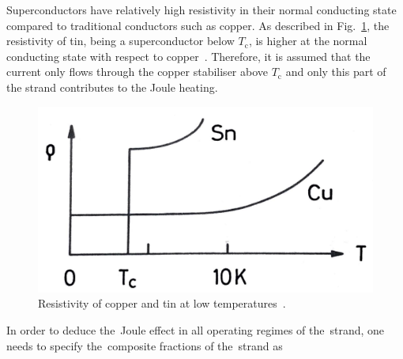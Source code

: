 Superconductors have relatively high resistivity in their normal conducting state compared to traditional conductors such as copper. As described in Fig.~\ref{fig:resitivity_tin_copper}, the resistivity of tin, being a superconductor below $T_\text{c}$, is higher at the normal conducting state with respect to copper~\cite[p.~1-6]{superconducting_accelerator_magnets}. Therefore, it is assumed that the current only flows through the copper stabiliser above $T_\text{c}$ and only this part of the strand contributes to the Joule heating. 

\begin{figure}[H]
    \centering
    \includegraphics[width=0.35\linewidth]{sections/introduction/figures/sn_cu_resistivity.png}
    \caption{Resistivity of copper and tin at low temperatures~\cite{superconducting_accelerator_magnets}.}
    \label{fig:resitivity_tin_copper}
\end{figure} 

In order to deduce the~Joule effect in all operating regimes of the~strand, one needs to specify the~composite fractions of the~strand as 

